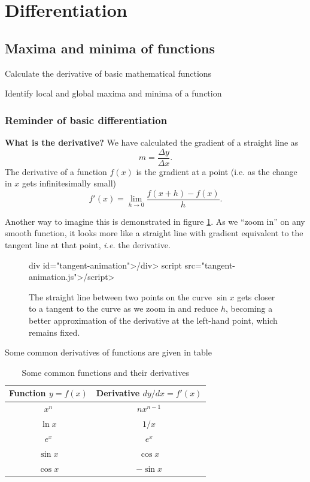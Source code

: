 \section{Differentiation}
\subsection{Maxima and minima of functions}
\begin{learningoutcomes}
\item Calculate the derivative of basic mathematical functions
\item Identify local and global maxima and minima of a function
\end{learningoutcomes}
\subsubsection{Reminder of basic differentiation}
\textbf{What is the derivative?} We have calculated the gradient of a straight line as
\[
m=\frac{\Delta y}{\Delta x}.
\]
The derivative of a function $f(x)$ is the gradient at a point (i.e. as the change in $x$ gets infinitesimally small)
\[
f'(x)=\lim_{h\to0}\frac{f(x+h)-f(x)}{h}.
\]

Another way to imagine this is demonstrated in figure \ref{fig:diff_zoom}. As we ``zoom in'' on any smooth function, it looks more like a straight line with gradient equivalent to the tangent line at that point, \textit{i.e.} the derivative.
\begin{figure}[h!]
    \centering
    \iflatexml
        \<div id="tangent-animation">\</div>
        \<script src="tangent-animation.js">\</script>
    \else
    \fi
    \caption{The straight line between two points on the curve $\sin x$ gets closer to a tangent to the curve as we zoom in and reduce $h$, becoming a better approximation of the derivative at the left-hand point, which remains fixed.}
    \label{fig:diff_zoom}
\end{figure}

Some common derivatives of functions are given in table \begin{table}[ht]
    \centering
    \begin{tabular}{|c|c|} \hline
    Function $y = f(x)$ & Derivative $dy/dx = f'(x)$ \\ \hline
    $x^n$ & $nx^{n-1}$\\
    $\ln x$ & $1/x$\\
    $e^x$ & $e^x$\\
    $\sin x$ & $\cos x$\\
    $\cos x$ & $-\sin x$\\\hline
    \end{tabular}
    \caption{Some common functions and their derivatives}
    \label{tab:derivatives}
\end{table}

